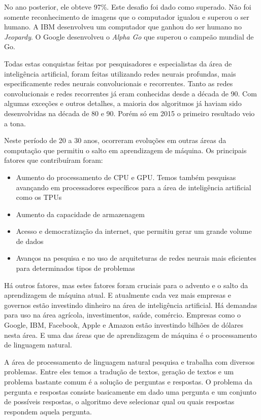 No ano posterior, ele obteve 97\%. Este desafio foi dado como superado. Não foi somente reconhecimento de imagens que o computador igualou e superou o ser humano. A IBM desenvolveu um computador que ganhou do ser humano no \textit{Jeopardy}. O Google desenvolveu o \textit{Alpha Go} que superou o campeão mundial de Go.

Todas estas conquistas feitas por pesquisadores e especialistas da área de inteligência artificial, foram feitas utilizando redes neurais profundas, mais especificamente redes neurais convolucionais e recorrentes. Tanto as redes convolucionais e redes recorrentes já eram conhecidas desde a década de 90. Com algumas exceções e outros detalhes, a maioria dos algoritmos já haviam sido desenvolvidas na década de 80 e 90. Porém só em 2015 o primeiro resultado veio a tona.

Neste período de 20 a 30 anos, ocorreram evoluções em outras áreas da computação que permitiu o salto em aprendizagem de máquina. Os principais fatores que contribuíram foram:

\begin{itemize}
    \item Aumento do processamento de CPU e GPU. Temos também pesquisas avançando em processadores específicos para a área de inteligência artificial como os TPUs
    \item Aumento da capacidade de armazenagem
    \item Acesso e democratização da internet, que permitiu gerar um grande volume de dados
    \item Avanços na pesquisa e no uso de arquiteturas de redes neurais mais eficientes para determinados tipos de problemas
\end{itemize}

Há outros fatores, mas estes fatores foram cruciais para o advento e o salto da aprendizagem de máquina atual. E atualmente cada vez mais empresas e governos estão investindo dinheiro na área de inteligência artificial. Há demandas para uso na área agrícola, investimentos, saúde, comércio. Empresas como o Google, IBM, Facebook, Apple e Amazon estão investindo bilhões de dólares nesta área. E uma das áreas que de aprendizagem de máquina é o processamento de linguagem natural. 

A área de processamento de linguagem natural pesquisa e trabalha com diversos problemas. Entre eles temos a tradução de textos, geração de textos  e um problema bastante comum é a solução de perguntas e respostas. O problema da pergunta e respostas consiste basicamente em dado uma pergunta e um conjunto de possíveis respostas, o algoritmo deve selecionar qual ou quais respostas respondem aquela pergunta.

